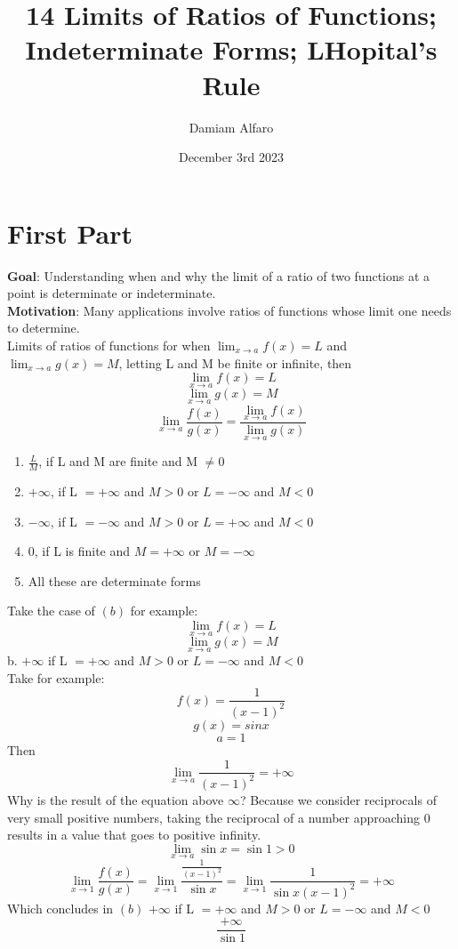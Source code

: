 \documentclass[12pt, letterpaper]{article}
\title{14 Limits of Ratios of Functions; Indeterminate Forms; LHopital’s Rule}
\author{Damiam Alfaro}
\date{December 3rd 2023}
\begin{document}
\maketitle

\section{First Part}
\textbf{Goal}: Understanding when and why the limit of a ratio of two functions at a point is determinate or indeterminate.\\
\newline
\textbf{Motivation}: Many applications involve ratios of functions whose limit one needs to determine.\\
\newline
Limits of ratios of functions for when \(\lim_{x \to a}f(x)=L\) and \(\lim_{x \to a}g(x)=M\), letting L and M be finite or infinite, then
\[\lim_{x \to a}f(x)=L\]
\[\lim_{x \to a}g(x)=M\]
\[\lim_{x \to a}\frac{f(x)}{g(x)} = \frac{\lim_{x \to a}f(x)}{\lim_{x \to a}g(x)}\]
\begin{enumerate}
    \item \(\frac{L}{M}\), if L and M are finite and M \(\neq 0\)
    \item \(+\infty\), if L \(= +\infty\) and \(M > 0\) or \(L=-\infty\) and \(M <0\)
    \item \(-\infty\), if L \(= -\infty\) and \(M > 0\) or \(L=+\infty\) and \(M <0\)
    \item 0, if L is finite and \(M = +\infty\) or \(M=-\infty\)
    \item All these are determinate forms
\end{enumerate}
Take the case of \((b)\) for example:
\[\lim_{x \to a}f(x)=L\]
\[\lim_{x \to a}g(x)=M\]
b. \(+\infty\) if L \(= +\infty\) and \(M > 0\) or \(L=-\infty\) and \(M <0\)\\
\newline
Take for example:
\[f(x) = \frac{1}{(x-1)^2}\]
\[g(x) = sinx\]
\[a = 1\]
Then
\[\lim_{x \to a}\frac{1}{(x-1)^2}=+\infty\]
Why is the result of the equation above \(\infty\)? Because we consider reciprocals of very small positive numbers, taking the reciprocal of a number approaching 0 results in a value that goes to positive infinity.\\
\newline
\[\lim_{x \to a}\sin{x}=\sin{1} >0\]
\[\lim_{x \to 1}\frac{f(x)}{g(x)}=\lim_{x \to 1}\frac{\frac{1}{(x-1)^2}}{\sin{x}}=\lim_{x \to 1}\frac{1}{\sin{x}(x-1)^2}=+\infty\]
Which concludes in \((b)\)
\(+\infty\) if L \(= +\infty\) and \(M > 0\) or \(L=-\infty\) and \(M <0\)
\[\frac{+\infty}{\sin{1}}\]
\end{document}
